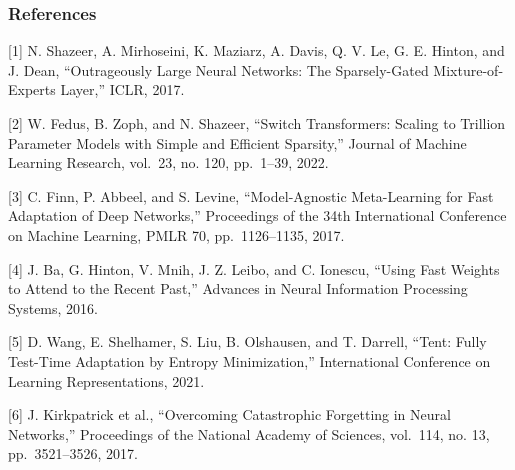 \documentclass[
  10pt,
]{article}
\begin{document}
\hypertarget{references}{%
\subsubsection{References}\label{references}}

{[}1{]} N. Shazeer, A. Mirhoseini, K. Maziarz, A. Davis, Q. V. Le, G. E.
Hinton, and J. Dean, ``Outrageously Large Neural Networks: The
Sparsely-Gated Mixture-of-Experts Layer,'' ICLR, 2017.

{[}2{]} W. Fedus, B. Zoph, and N. Shazeer, ``Switch Transformers:
Scaling to Trillion Parameter Models with Simple and Efficient
Sparsity,'' Journal of Machine Learning Research, vol.~23, no. 120,
pp.~1--39, 2022.

{[}3{]} C. Finn, P. Abbeel, and S. Levine, ``Model-Agnostic
Meta-Learning for Fast Adaptation of Deep Networks,'' Proceedings of the
34th International Conference on Machine Learning, PMLR 70,
pp.~1126--1135, 2017.

{[}4{]} J. Ba, G. Hinton, V. Mnih, J. Z. Leibo, and C. Ionescu, ``Using
Fast Weights to Attend to the Recent Past,'' Advances in Neural
Information Processing Systems, 2016.

{[}5{]} D. Wang, E. Shelhamer, S. Liu, B. Olshausen, and T. Darrell,
``Tent: Fully Test-Time Adaptation by Entropy Minimization,''
International Conference on Learning Representations, 2021.

{[}6{]} J. Kirkpatrick et al., ``Overcoming Catastrophic Forgetting in
Neural Networks,'' Proceedings of the National Academy of Sciences,
vol.~114, no. 13, pp.~3521--3526, 2017.
\end{document}
